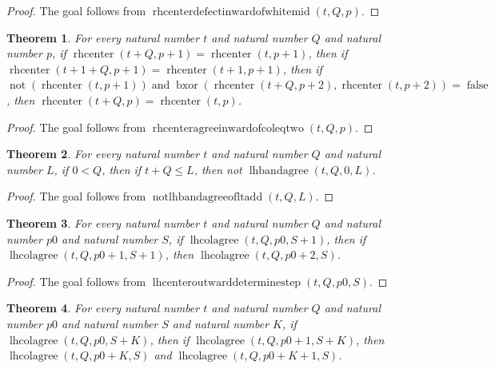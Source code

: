 \documentclass[11pt]{article}
\newtheorem{theorem}{Theorem}[section]
\theoremstyle{definition}
\begin{document}
\begin{proof}
The goal follows from \(\operatorname{rhcenterdefectinwardofwhitemid}(t, Q, p)\).
\end{proof}
\begin{theorem}
\label{ll:paper:rhcenter-agree-inward-of-col-eq-two}
For every natural number \(t\) and natural number \(Q\) and natural number \(p\), if \(\operatorname{rhcenter}(t + Q, p + 1) = \operatorname{rhcenter}(t, p + 1)\), then if \(\operatorname{rhcenter}(t + 1 + Q, p + 1) = \operatorname{rhcenter}(t + 1, p + 1)\), then if \(\operatorname{not}(\operatorname{rhcenter}(t, p + 1)) \operatorname{and} \operatorname{bxor}(\operatorname{rhcenter}(t + Q, p + 2), \operatorname{rhcenter}(t, p + 2)) = \operatorname{false}\), then \(\operatorname{rhcenter}(t + Q, p) = \operatorname{rhcenter}(t, p)\).
\end{theorem}
\begin{proof}
The goal follows from \(\operatorname{rhcenteragreeinwardofcoleqtwo}(t, Q, p)\).
\end{proof}
\begin{theorem}
\label{ll:paper:not-lhbandagree-of-lt-add}
For every natural number \(t\) and natural number \(Q\) and natural number \(L\), if \(0 < Q\), then if \(t + Q \le L\), then not \(\operatorname{lhbandagree}(t, Q, 0, L)\).
\end{theorem}
\begin{proof}
The goal follows from \(\operatorname{notlhbandagreeofltadd}(t, Q, L)\).
\end{proof}
\begin{theorem}
\label{ll:paper:lhcenter-outward-determine-step}
For every natural number \(t\) and natural number \(Q\) and natural number \(p0\) and natural number \(S\), if \(\operatorname{lhcolagree}(t, Q, p0, S + 1)\), then if \(\operatorname{lhcolagree}(t, Q, p0 + 1, S + 1)\), then \(\operatorname{lhcolagree}(t, Q, p0 + 2, S)\).
\end{theorem}
\begin{proof}
The goal follows from \(\operatorname{lhcenteroutwarddeterminestep}(t, Q, p0, S)\).
\end{proof}
\begin{theorem}
\label{ll:paper:lhcenter-outward-determine}
For every natural number \(t\) and natural number \(Q\) and natural number \(p0\) and natural number \(S\) and natural number \(K\), if \(\operatorname{lhcolagree}(t, Q, p0, S + K)\), then if \(\operatorname{lhcolagree}(t, Q, p0 + 1, S + K)\), then \(\operatorname{lhcolagree}(t, Q, p0 + K, S)\) and \(\operatorname{lhcolagree}(t, Q, p0 + K + 1, S)\).
\end{theorem}
\end{document}
